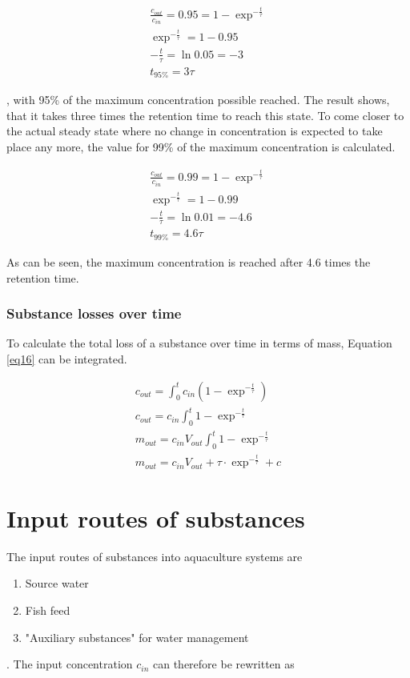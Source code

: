 \documentclass{scrartcl}
\begin{document}
\begin{align}
	\frac{c_{out}}{c_{in}} = 0.95 = 1 - \exp^{-\frac{t}{\tau}}\\
	\exp^{-\frac{t}{\tau}} = 1 - 0.95\\
	-\frac{t}{\tau} = \ln{0.05} = -3\\
	t_{95\%} = 3\tau
\end{align}

, with 95\% of the maximum concentration possible reached. The result shows, that it takes three times the retention time to reach this state. To come closer to the actual steady state where no change in concentration is expected to take place any more, the value for 99\%  of the maximum concentration is calculated.

\begin{align}
	\frac{c_{out}}{c_{in}} = 0.99 = 1 - \exp^{-\frac{t}{\tau}}\\
	\exp^{-\frac{t}{\tau}} = 1 - 0.99\\
	-\frac{t}{\tau} = \ln{0.01} = -4.6\\
	t_{99\%} = 4.6\tau
\end{align}

As can be seen, the maximum concentration is reached after 4.6 times the retention time.



\subsubsection{Substance losses over time}
To calculate the total loss of a substance over time in terms of mass, Equation \ref{eq16} can be integrated.


\begin{align}
	c_{out} = \int_{0}^{t} c_{in}(1 - \exp^{-\frac{t}{\tau}})\\
	c_{out} = c_{in}\int_{0}^{t} 1 - \exp^{-\frac{t}{\tau}}\\
	m_{out} = c_{in} V_{out} \int_{0}^{t} 1 - \exp^{-\frac{t}{\tau}}\\
	m_{out} = c_{in} V_{out} + \tau \cdot \exp^{-\frac{t}{\tau}} + c
\end{align}


\section{Input routes of substances}
The input routes of substances into aquaculture systems are 
\begin{enumerate}
	\item Source water
	\item Fish feed
	\item "Auxiliary substances" for water management
\end{enumerate}
. The input concentration $c_{in}$ can therefore be rewritten as
\end{document}

